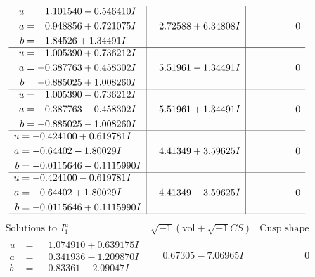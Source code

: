 \documentclass[1p]{elsarticle_modified}
\theoremstyle{definition}
\newcommand{\I}{\sqrt{-1}}
\begin{document}
$$\begin{array}{c|c|c}
\begin{aligned}
u &= \phantom{-}1.101540 - 0.546410 I \\
a &= \phantom{-}0.948856 + 0.721075 I \\
b &= \phantom{-}1.84526 + 1.34491 I\end{aligned}
 & \phantom{-}2.72588 + 6.34808 I & \phantom{-0.000000 } 0 \\ \hline\begin{aligned}
u &= \phantom{-}1.005390 + 0.736212 I \\
a &= -0.387763 + 0.458302 I \\
b &= -0.885025 + 1.008260 I\end{aligned}
 & \phantom{-}5.51961 - 1.34491 I & \phantom{-0.000000 } 0 \\ \hline\begin{aligned}
u &= \phantom{-}1.005390 - 0.736212 I \\
a &= -0.387763 - 0.458302 I \\
b &= -0.885025 - 1.008260 I\end{aligned}
 & \phantom{-}5.51961 + 1.34491 I & \phantom{-0.000000 } 0 \\ \hline\begin{aligned}
u &= -0.424100 + 0.619781 I \\
a &= -0.64402 - 1.80029 I \\
b &= -0.0115646 - 0.1115990 I\end{aligned}
 & \phantom{-}4.41349 + 3.59625 I & \phantom{-0.000000 } 0 \\ \hline\begin{aligned}
u &= -0.424100 - 0.619781 I \\
a &= -0.64402 + 1.80029 I \\
b &= -0.0115646 + 0.1115990 I\end{aligned}
 & \phantom{-}4.41349 - 3.59625 I & \phantom{-0.000000 } 0\\
 \hline 
 \end{array}$$\newpage$$\begin{array}{c|c|c}  
\text{Solutions to }I^u_{1}& \I (\text{vol} + \sqrt{-1}CS) & \text{Cusp shape}\\
 \hline 
\begin{aligned}
u &= \phantom{-}1.074910 + 0.639175 I \\
a &= \phantom{-}0.341936 - 1.209870 I \\
b &= \phantom{-}0.83361 - 2.09047 I\end{aligned}
 & \phantom{-}0.67305 - 7.06965 I & \phantom{-0.000000 } 0 \\ \hline\begin{aligned}

\end{aligned}
\end{array}$$
\end{document}
